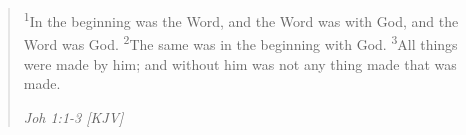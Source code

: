 \begin{quote}
\textsuperscript{1}In the beginning was the Word, and the Word was with God, and the Word was God.
\textsuperscript{2}The same was in the beginning with God.
\textsuperscript{3}All things were made by him; and without him was not any thing made that was made.
\begin{flushright}
\emph{Joh 1:1-3 [KJV]}
\end{flushright}
\end{quote}